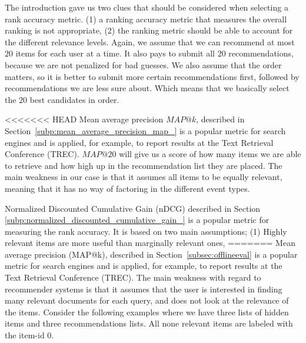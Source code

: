 The introduction gave us two clues that should be considered when selecting a rank accuracy metric.
(1) a ranking accuracy metric that measures the overall ranking is not appropriate, (2) the ranking
metric should be able to account for the different relevance levels.
Again, we assume that we can recommend at most $20$ items for each user at a time. It also pays to submit all $20$
recommendations, because we are not penalized for bad guesses. We also assume that the order matters, so it
is better to submit more certain recommendations first, followed by recommendations we are less sure about.
Which means that we basically select the $20$ best candidates in order. 

<<<<<<< HEAD
Mean average precision $MAP@k$, described in Section~\ref{subp:mean_average_precision_map_} is a popular metric for search
engines and is applied, for example, to report results at the Text Retrieval Conference (TREC). $MAP@20$ will give us a score
of how many items we are able to retrieve and how high up in the recommendation list they are placed. The main weakness in our
case is that it assumes all items to be equally relevant, meaning that it has no way of factoring in the different event types.

Normalized Discounted Cumulative Gain (nDCG) described in Section \ref{subp:normalized_discounted_cumulative_gain_} is a popular metric for
measuring the rank accuracy. It is based on two main assumptions; (1) Highly relevant items are more useful than marginally relevant ones,
=======
Mean average precision (MAP@k), described in Section~\ref{subsec:offlineeval} is a popular metric for search
engines and is applied, for example, to report results at the Text Retrieval Conference (TREC). The main weakness with regard
to recommender systems is that it assumes that the user is interested in finding many relevant documents for each query, and
does not look at the relevance of the items. Consider the following examples where we have three lists of hidden items and
three recommendations lists. All none relevant items are labeled with the item-id $0$.

